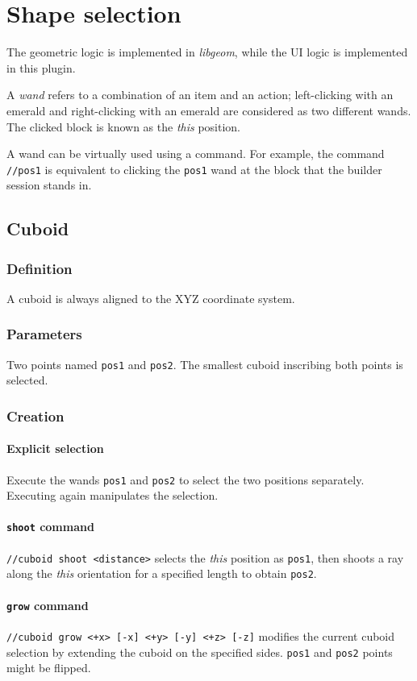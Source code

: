 \documentclass{report}
\begin{document}
		\section{Shape selection}
			\label{sec:shape-selection}
			The geometric logic is implemented in \textit{libgeom}, while the UI logic is implemented in this plugin.

			A \emph{wand} refers to a combination of an item and an action; left-clicking with an emerald and
			right-clicking with an emerald are considered as two different wands. The clicked block is known as the
			\textit{this} position.

			A wand can be virtually used using a command. For example, the command \texttt{//pos1} is equivalent to
			clicking the \texttt{pos1} wand at the block that the builder session stands in.

			\subsection{Cuboid}
				\subsubsection{Definition} A cuboid is always aligned to the XYZ coordinate system.
				\subsubsection{Parameters} Two points named \texttt{pos1} and \texttt{pos2}. The smallest cuboid
				inscribing both points is selected.
				\subsubsection{Creation}
					\paragraph{Explicit selection} Execute the wands \texttt{pos1} and \texttt{pos2} to select the two
					positions separately. Executing again manipulates the selection.
					\paragraph{\texttt{shoot} command} \texttt{//cuboid shoot <distance>} selects the \textit{this}
					position as \texttt{pos1}, then shoots a ray along the \textit{this} orientation for a specified
					length to obtain \texttt{pos2}.
					\paragraph{\texttt{grow} command} \texttt{//cuboid grow <+x> [-x] <+y> [-y] <+z> [-z]} modifies the
					current cuboid selection by extending the cuboid on the specified sides. \texttt{pos1} and
					\texttt{pos2} points might be flipped.
\end{document}
